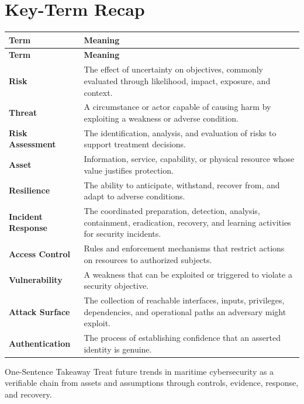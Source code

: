 \documentclass[11pt,letterpaper]{article}
\begin{document}
\section*{Key-Term Recap}
\begin{longtable}{>{\raggedright\arraybackslash}p{}>{\raggedright\arraybackslash}p{}}
\toprule\rowcolor{Navy}\color{white}\textbf{Term} & \color{white}\textbf{Meaning}\\\midrule
\endfirsthead
\toprule\rowcolor{Navy}\color{white}\textbf{Term} & \color{white}\textbf{Meaning}\\\midrule
\endhead
\textbf{Risk} & The effect of uncertainty on objectives, commonly evaluated through likelihood, impact, exposure, and context. \\\midrule
\textbf{Threat} & A circumstance or actor capable of causing harm by exploiting a weakness or adverse condition. \\\midrule
\textbf{Risk Assessment} & The identification, analysis, and evaluation of risks to support treatment decisions. \\\midrule
\textbf{Asset} & Information, service, capability, or physical resource whose value justifies protection. \\\midrule
\textbf{Resilience} & The ability to anticipate, withstand, recover from, and adapt to adverse conditions. \\\midrule
\textbf{Incident Response} & The coordinated preparation, detection, analysis, containment, eradication, recovery, and learning activities for security incidents. \\\midrule
\textbf{Access Control} & Rules and enforcement mechanisms that restrict actions on resources to authorized subjects. \\\midrule
\textbf{Vulnerability} & A weakness that can be exploited or triggered to violate a security objective. \\\midrule
\textbf{Attack Surface} & The collection of reachable interfaces, inputs, privileges, dependencies, and operational paths an adversary might exploit. \\\midrule
\textbf{Authentication} & The process of establishing confidence that an asserted identity is genuine. \\\midrule
\bottomrule
\end{longtable}
\begin{CornellExamBox}{One-Sentence Takeaway}
Treat future trends in maritime cybersecurity as a verifiable chain from assets and assumptions through controls, evidence, response, and recovery.
\end{CornellExamBox}
\end{document}
